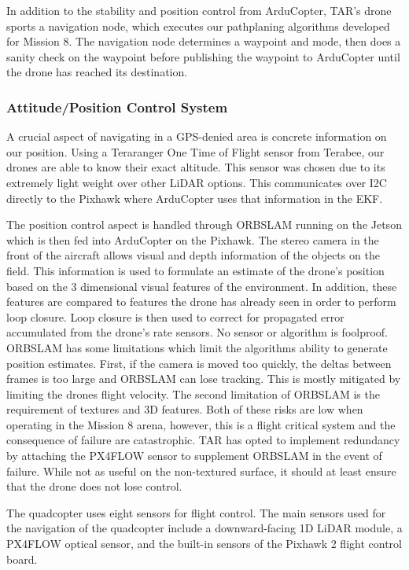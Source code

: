 \documentclass[12pt,letterpaper]{article}
\begin{document}
			In addition to the stability and position control from ArduCopter, TAR’s drone sports a navigation node, which executes our pathplaning algorithms developed for Mission 8. The navigation node determines a waypoint and mode, then does a sanity check on the waypoint before publishing the waypoint to ArduCopter until the drone has reached its destination.

		\subsubsection*{Attitude/Position Control System}

			A crucial aspect of navigating in a GPS-denied area is concrete information on our position. Using a Teraranger One Time of Flight sensor from Terabee, our drones are able to know their exact altitude. This sensor was chosen due to its extremely light weight over other LiDAR options. This communicates over I2C directly to the Pixhawk where ArduCopter uses that information in the EKF.

			The position control aspect is handled through ORBSLAM running on the Jetson which is then fed into ArduCopter on the Pixhawk. The stereo camera in the front of the aircraft allows visual and depth information of the objects on the field. This information is used to formulate an estimate of the drone’s position based on the 3 dimensional visual features of the environment. In addition, these features are compared to features the drone has already seen in order to perform loop closure. Loop closure is then used to correct for propagated error accumulated from the drone’s rate sensors. No sensor or algorithm is foolproof. ORBSLAM has some limitations which limit the algorithms ability to generate position estimates. First, if the camera is moved too quickly, the deltas between frames is too large and ORBSLAM can lose tracking. This is mostly mitigated by limiting the drones flight velocity. The second limitation of ORBSLAM is the requirement of textures and 3D features. Both of these risks are low when operating in the Mission 8 arena, however, this is a flight critical system and the consequence of failure are catastrophic. TAR has opted to implement redundancy by attaching the PX4FLOW sensor to supplement ORBSLAM in the event of failure. While not as useful on the non-textured surface, it should at least ensure that the drone does not lose control.

			The quadcopter uses eight sensors for flight control. The main sensors used for the navigation of the quadcopter include a downward-facing 1D LiDAR module, a PX4FLOW optical sensor, and the built-in sensors of the Pixhawk 2 flight control board.
\end{document}
